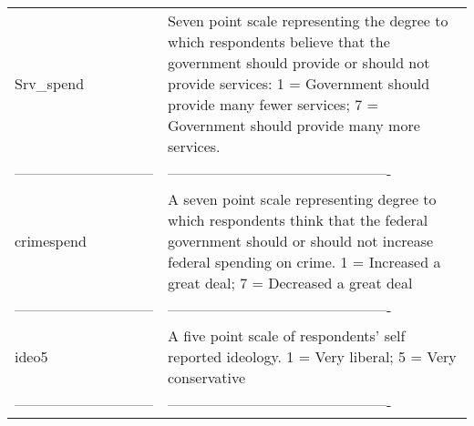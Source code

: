 \documentclass[]{article}
\begin{document}
\begin{longtable}[]{@{}ll@{}}
\begin{minipage}[t]{0.37\columnwidth}
Srv\_spend\strut
\end{minipage} & \begin{minipage}[t]{0.57\columnwidth}\raggedright\strut
Seven point scale representing the degree to which respondents believe
that the government should provide or should not provide services: 1 =
Government should provide many fewer services; 7 = Government should
provide many more services.\strut
\end{minipage}\tabularnewline
\begin{minipage}[t]{0.37\columnwidth}\raggedright\strut
-----------------------------\strut
\end{minipage} & \begin{minipage}[t]{0.57\columnwidth}\raggedright\strut
----------------------------------------------\strut
\end{minipage}\tabularnewline
\begin{minipage}[t]{0.37\columnwidth}\raggedright\strut
crimespend\strut
\end{minipage} & \begin{minipage}[t]{0.57\columnwidth}\raggedright\strut
A seven point scale representing degree to which respondents think that
the federal government should or should not increase federal spending on
crime. 1 = Increased a great deal; 7 = Decreased a great deal\strut
\end{minipage}\tabularnewline
\begin{minipage}[t]{0.37\columnwidth}\raggedright\strut
-----------------------------\strut
\end{minipage} & \begin{minipage}[t]{0.57\columnwidth}\raggedright\strut
----------------------------------------------\strut
\end{minipage}\tabularnewline
\begin{minipage}[t]{0.37\columnwidth}\raggedright\strut
ideo5\strut
\end{minipage} & \begin{minipage}[t]{0.57\columnwidth}\raggedright\strut
A five point scale of respondents' self reported ideology. 1 = Very
liberal; 5 = Very conservative\strut
\end{minipage}\tabularnewline
\begin{minipage}[t]{0.37\columnwidth}\raggedright\strut
-----------------------------\strut
\end{minipage} & \begin{minipage}[t]{0.57\columnwidth}\raggedright\strut
----------------------------------------------\strut

\end{minipage}
\end{longtable}
\end{document}
